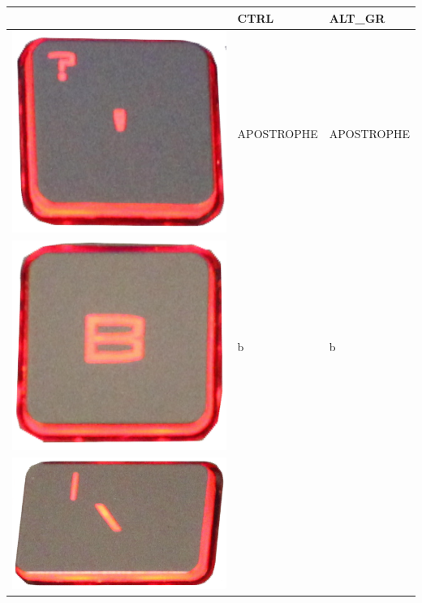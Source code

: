 \begin{longtable}{|cll|}
\begin{minipage}[c]{.3\textwidth}
\vspace{0.2cm}
\end{minipage} & CTRL & ALT\_GR\\
\hline
\begin{minipage}[c]{.3\textwidth}
\vspace{0.2cm}
\includegraphics[scale=0.06]{Images/KeyMapping/APOSTROPHE}
\vspace{0.2cm}
\end{minipage} & APOSTROPHE & APOSTROPHE\\
\hline
\begin{minipage}[c]{.3\textwidth}
\vspace{0.2cm}
\includegraphics[scale=0.06]{Images/KeyMapping/b}
\vspace{0.2cm}
\end{minipage} & b & b\\
\hline
\begin{minipage}[c]{.3\textwidth}
\vspace{0.2cm}
\includegraphics[scale=0.06]{Images/KeyMapping/BACKSLASH}

\end{minipage}
\end{longtable}

